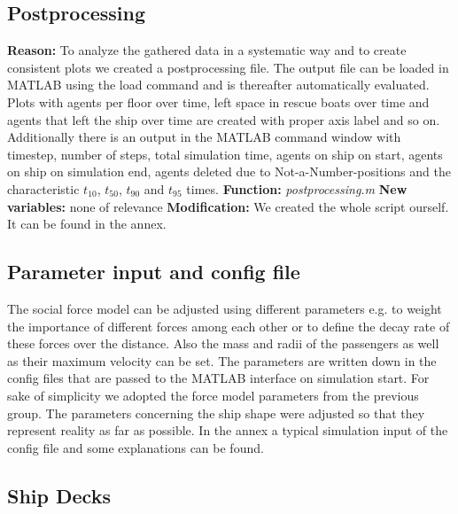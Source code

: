 \documentclass[11pt]{article}
\begin{document}
\subsection{Postprocessing}
\textbf{Reason:}
\newline
To analyze the gathered data in a systematic way and to create consistent plots we created a postprocessing file. The output file can be loaded in MATLAB using the load command and is thereafter automatically evaluated. Plots with agents per floor over time, left space in rescue boats over time and agents that left the ship over time are created with proper axis label and so on. Additionally there is an output in the MATLAB command window with timestep, number of steps, total simulation time, agents on ship on start, agents on ship on simulation end, agents deleted due to Not-a-Number-positions and the characteristic $t_{10}$, $t_{50}$, $t_{90}$ and $t_{95}$ times.
\newline
\textbf{Function:}
\newline
\textit{postprocessing.m}
\newline
\textbf{New variables:}
\newline
none of relevance
\newline
\textbf{Modification:}
\newline
We created the whole script ourself. It can be found in the annex.
\subsection{Parameter input and config file}
The social force model can be adjusted using different parameters e.g. to weight the importance of different forces among each other or to define the decay rate of these forces over the distance. Also the mass and radii of the passengers as well as their maximum velocity can be set. The parameters are written down in the config files that are passed to the MATLAB interface on simulation start. For sake of simplicity we adopted the force model parameters from the previous group. The parameters concerning the ship shape were adjusted so that they represent reality as far as possible.
\newline
In the annex a typical simulation input of the config file and some explanations can be found.

\subsection{Ship Decks}
\end{document}
